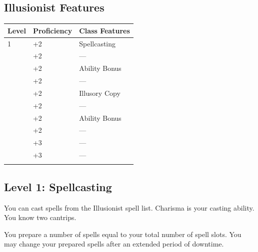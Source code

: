 \documentclass[12pt,letterpaper,twocolumn,openany,nodeprecatedcode,bg=none]{dndbook}
\let\oldsubsection\subsection
\renewcommand{\subsection}[1]{%
  \needspace{5\baselineskip}%
  \oldsubsection{#1}%
}
\begin{document}
\subsection{Illusionist Features}\label{illusionist-features}


{\def\LTcaptype{none} %
\begin{table}[!htbp]
\centering
\begin{tabular}{@{}
  >{\raggedright\arraybackslash}p{}
  >{\raggedright\arraybackslash}p{}
  >{\raggedright\arraybackslash}p{}@{}}
\toprule\noalign{}
\begin{minipage}[b]{\linewidth}\raggedright
Level
\end{minipage} & \begin{minipage}[b]{\linewidth}\raggedright
Proficiency
\end{minipage} & \begin{minipage}[b]{\linewidth}\raggedright
Class Features
\end{minipage} \\
\midrule\noalign{}
1 & +2 & Spellcasting \\
2 & +2 & --- \\
3 & +2 & Ability Bonus \\
4 & +2 & --- \\
5 & +2 & Illusory Copy \\
6 & +2 & --- \\
7 & +2 & Ability Bonus \\
8 & +2 & --- \\
9 & +3 & --- \\
10 & +3 & --- \\
\bottomrule\noalign{}
\end{tabular}
\end{table}
}

\subsection{Level 1: Spellcasting}\label{level-1-spellcasting}

You can cast spells from the Illusionist spell list. Charisma is your
casting ability. You know two cantrips.

You prepare a number of spells equal to your total number of spell
slots. You may change your prepared spells after an extended period of
downtime.
\end{document}
